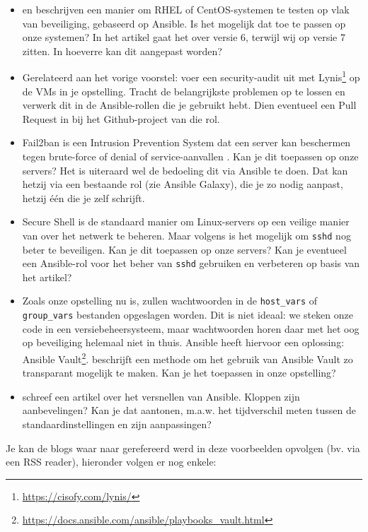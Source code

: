 \begin{itemize}
  \item \textcite{Hayden2015} en \textcite{Davila2015} beschrijven een manier om RHEL of CentOS-sys\-te\-men te testen op vlak van beveiliging, gebaseerd op Ansible. Is het mogelijk dat toe te passen op onze systemen? In het artikel gaat het over versie 6, terwijl wij op versie 7 zitten. In hoeverre kan dit aangepast worden?
  \item Gerelateerd aan het vorige voorstel: voer een security-audit uit met Lynis\footnote{\url{https://cisofy.com/lynis/}} op de VMs in je opstelling. Tracht de belangrijkste problemen op te lossen en verwerk dit in de Ansible-rollen die je gebruikt hebt. Dien eventueel een Pull Request in bij het Github-project van die rol.
  \item Fail2ban is een Intrusion Prevention System dat een server kan beschermen tegen brute-force of denial of service-aanvallen \autocite{Sawiyati2014}. Kan je dit toepassen op onze servers? Het is uiteraard wel de bedoeling dit via Ansible te doen. Dat kan hetzij via een bestaande rol (zie Ansible Galaxy), die je zo nodig aanpast, hetzij één die je zelf schrijft.
  \item Secure Shell is de standaard manier om Linux-servers op een veilige manier van over het netwerk te beheren. Maar volgens \textcite{stribika2015} is het mogelijk om \texttt{sshd} nog beter te beveiligen. Kan je dit toepassen op onze servers? Kan je eventueel een Ansible-rol voor het beher van \texttt{sshd} gebruiken en verbeteren op basis van het artikel?
  \item Zoals onze opstelling nu is, zullen wachtwoorden in de \texttt{host\_vars} of \texttt{group\_vars} bestanden opgeslagen worden. Dit is niet ideaal: we steken onze code in een versiebeheersysteem, maar wachtwoorden horen daar met het oog op beveiliging helemaal niet in thuis. Ansible heeft hiervoor een oplossing: Ansible Vault\footnote{\url{https://docs.ansible.com/ansible/playbooks_vault.html}}. \textcite{Blanc2015} beschrijft een methode om het gebruik van Ansible Vault zo transparant mogelijk te maken. Kan je het toepassen in onze opstelling?
  \item \textcite{Johnson2015} schreef een artikel over het versnellen van Ansible. Kloppen zijn aanbevelingen? Kan je dat aantonen, m.a.w. het tijdverschil meten tussen de standaardinstellingen en zijn aanpassingen?
\end{itemize}

Je kan de blogs waar naar gerefereerd werd in deze voorbeelden opvolgen (bv. via een RSS reader), hieronder volgen er nog enkele:

